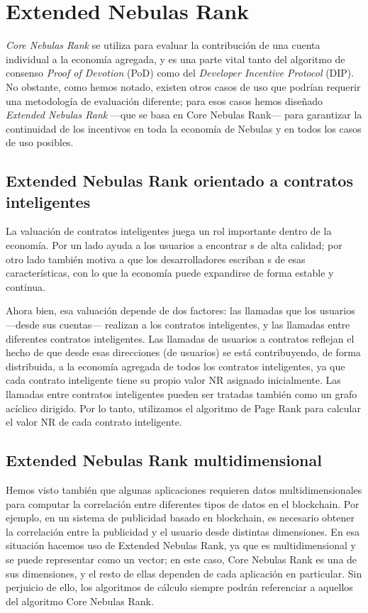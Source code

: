 \section{Extended Nebulas Rank}
\textit{Core Nebulas Rank} se utiliza para evaluar la contribución de una cuenta individual a la economía agregada, y es una parte vital tanto del algoritmo de consenso \textit{Proof of Devotion} (PoD) como del \textit{Developer Incentive Protocol} (DIP). No obstante, como hemos notado, existen otros casos de uso que podrían requerir una metodología de evaluación diferente; para esos casos hemos diseñado \textit{Extended Nebulas Rank} —que se basa en Core Nebulas Rank— para garantizar la continuidad de los incentivos en toda la economía de Nebulas y en todos los casos de uso posibles.

\subsection{Extended Nebulas Rank orientado a contratos inteligentes}
La valuación de contratos inteligentes juega un rol importante dentro de la economía. Por un lado ayuda a los usuarios a encontrar {\dapp}s de alta calidad; por otro lado también motiva a que los desarrolladores escriban {\dapp}s de esas características, con lo que la economía puede expandirse de forma estable y continua.

Ahora bien, esa valuación depende de dos factores: las llamadas que los usuarios —desde sus cuentas— realizan a los contratos inteligentes, y las llamadas entre diferentes contratos inteligentes. Las llamadas de usuarios a contratos reflejan el hecho de que desde esas direcciones (de usuarios) se está contribuyendo, de forma distribuida, a la economía agregada de todos los contratos inteligentes, ya que cada contrato inteligente tiene su propio valor NR asignado inicialmente. Las llamadas entre contratos inteligentes pueden ser tratadas también como un grafo acíclico dirigido. Por lo tanto, utilizamos el algoritmo de Page Rank para calcular el valor NR de cada contrato inteligente.

\subsection{Extended Nebulas Rank multidimensional}
Hemos visto también que algunas aplicaciones requieren datos multidimensionales para computar la correlación entre diferentes tipos de datos en el blockchain. Por ejemplo, en un sistema de publicidad basado en blockchain, es necesario obtener la correlación entre la publicidad y el usuario desde distintas dimensiones. En esa situación hacemos uso de Extended Nebulas Rank, ya que es multidimensional y se puede representar como un vector; en este caso, Core Nebulas Rank es una de sus dimensiones, y el resto de ellas dependen de cada aplicación en particular. Sin perjuicio de ello, los algoritmos de cálculo siempre podrán referenciar a aquellos del algoritmo Core Nebulas Rank.

